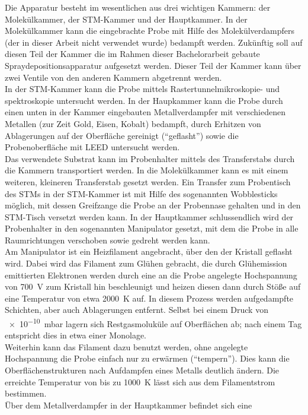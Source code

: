 Die Apparatur besteht im wesentlichen aus drei wichtigen Kammern: 
der 
Molekülkammer, der STM-Kammer und der Hauptkammer. In der Molekülkammer kann die eingebrachte
Probe mit Hilfe des Molekülverdampfers (der in dieser Arbeit nicht verwendet wurde) bedampft werden.
Zukünftig soll auf diesen Teil der Kammer die im Rahmen dieser Bachelorarbeit gebaute
Spraydepositionsapparatur aufgesetzt werden. Dieser Teil der Kammer kann über zwei Ventile von den
anderen Kammern abgetrennt werden.
\\
In der STM-Kammer kann die Probe
mittels Rastertunnelmikroskopie- und spektroskopie untersucht werden. In der Haupkammer kann die
Probe durch einen unten in der Kammer eingebauten Metallverdampfer mit
verschiedenen Metallen (zur Zeit Gold, Eisen, Kobalt) bedampft, durch Erhitzen von Ablagerungen auf
der Oberfläche gereinigt ("`geflasht"') sowie die Probenoberfläche mit LEED untersucht werden. 
\\
Das verwendete Substrat kann im Probenhalter mittels des
Transferstabs durch die Kammern transportiert werden. In die Molekülkammer kann es mit einem
weiteren, kleineren Transferstab gesetzt werden. Ein Transfer zum Probentisch des STMs in der
STM-Kammer ist mit Hilfe des sogenannten Wobblesticks möglich, mit dessen Greifzange die Probe an der Probennase gehalten und in
den STM-Tisch versetzt werden kann. In der Hauptkammer schlussendlich wird der Probenhalter in den
sogenannten Manipulator gesetzt, mit dem die Probe in alle Raumrichtungen verschoben sowie gedreht
werden kann. 
\\
Am Manipulator ist ein Heizfilament angebracht, über den der Kristall geflasht wird.
Dabei wird das Filament zum Glühen gebracht, die durch Glühemission emittierten Elektronen werden
durch eine an die Probe angelegte Hochspannung von \SI{700}{V} zum Kristall hin beschleunigt und
heizen diesen dann durch Stöße auf eine Temperatur von etwa \SI{2000}{K} auf. In diesem Prozess
werden aufgedampfte Schichten, aber auch Ablagerungen entfernt. Selbst bei einem Druck von \SI{e-10}{mbar} lagern sich
Restgasmoluküle auf Oberflächen ab; nach einem Tag entspricht dies in etwa einer Monolage.
\\
Weiterhin kann das Filament dazu benutzt werden, ohne angelegte Hochspannung die Probe einfach nur
zu erwärmen ("`tempern"'). Dies kann die Oberflächenstrukturen nach Aufdampfen eines Metalls
deutlich ändern. Die erreichte Temperatur von bis zu \SI{1000}{K} lässt sich aus dem Filamentstrom
bestimmen.
\\
 Über dem Metallverdampfer in der Hauptkammer befindet sich eine
